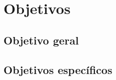 \chapter{Objetivos}
\label{chap:objetivos}

\section{Objetivo geral}
\label{sec:objetivo_geral}

\lipsum[5]
\section{Objetivos específicos}
\label{sec:objetivos_especificos}

\lipsum[6-7]

